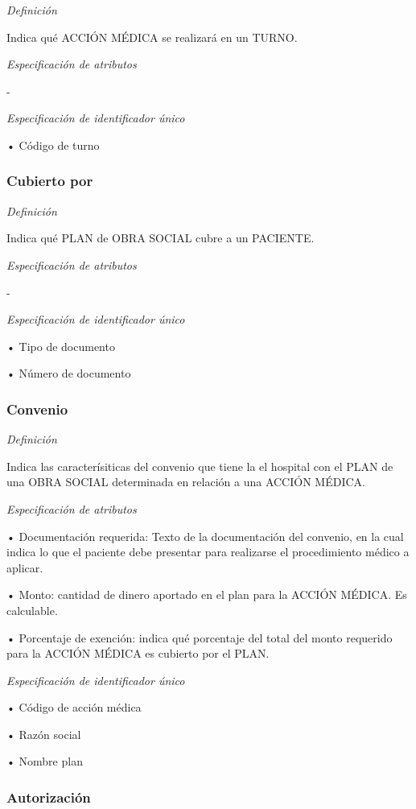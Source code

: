 \documentclass[a4paper,11pt]{article}
\begin{document}
\textit{Definición}

Indica qué ACCIÓN MÉDICA se realizará en un TURNO.

\textit{Especificación de atributos}

-

\textit{Especificación de identificador único}

• Código de turno\label{HToc293405822}

\subsubsection{\textbf{Cubierto por}}

\textit{Definición}

Indica qué PLAN de OBRA SOCIAL cubre a un PACIENTE.

\textit{Especificación de atributos}

-

\textit{Especificación de identificador único}

• Tipo de documento

• Número de documento\label{HToc293405823}

\subsubsection{\textbf{Convenio}}

\textit{Definición}

Indica las caracterísiticas del convenio que tiene la el hospital con el PLAN 
de una OBRA SOCIAL determinada en relación a una ACCIÓN MÉDICA.

\textit{Especificación de atributos}

• Documentación requerida: Texto de la documentación del convenio, en la cual 
indica lo que el paciente debe presentar para realizarse el procedimiento médico 
a aplicar.

• Monto: cantidad de dinero aportado en el plan para la ACCIÓN MÉDICA. Es calculable.

• Porcentaje de exención: indica qué porcentaje del total del monto requerido 
para la ACCIÓN MÉDICA es cubierto por el PLAN.

\textit{Especificación de identificador único}

• Código de acción médica

• Razón social

• Nombre plan\label{HToc293405824}

\subsubsection{\textbf{Autorización}}
\end{document}
